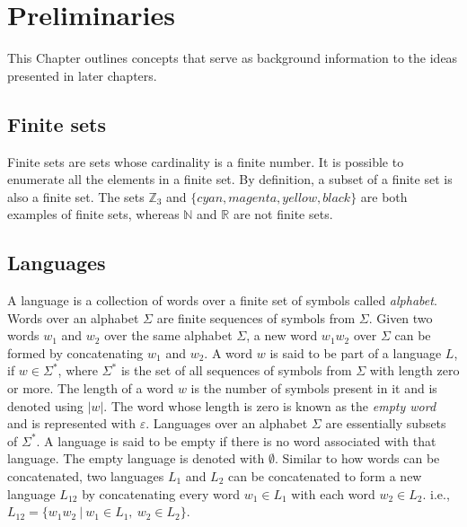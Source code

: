 \chapter{Preliminaries}\label{ch:prelims}
This Chapter outlines concepts that serve as background information to
the ideas presented in later chapters.

\section{Finite sets}
Finite sets are sets whose cardinality is a finite number.
It is possible to enumerate all the elements in a finite set.
By definition, a subset of a finite set is also a finite set.
The sets $\mathbb{Z}_3$ and $\{cyan, magenta, yellow, black\}$ are
both examples of finite sets, whereas $\mathbb{N}$ and $\mathbb{R}$
are not finite sets.            %

\section{Languages}
A language is a collection of words over a finite set of symbols
called \emph{alphabet}.
Words over an alphabet $\Sigma$ are finite sequences of symbols from
$\Sigma$.
Given two words $w_1$ and $w_2$ over the same alphabet $\Sigma$, a new
word $w_1 w_2$ over $\Sigma$ can be formed by concatenating $w_1$ and
$w_2$.
A word $w$ is said to be part of a language $L$, if $w \in \Sigma^*$,
where $\Sigma^*$ is the set of all sequences of symbols from $\Sigma$
with length zero or more.
The length of a word $w$ is the number of symbols present in it and is
denoted using $|w|$.
The word whose length is zero is known as the \emph{empty word} and is
represented with $\varepsilon$.
Languages over an alphabet $\Sigma$ are essentially subsets of
$\Sigma^*$.
A language is said to be empty if there is no word associated with
that language.
The empty language is denoted with $\emptyset$.
Similar to how words can be concatenated, two languages $L_1$ and
$L_2$ can be concatenated to form a new language $L_{12}$ by
concatenating every word $w_1 \in L_1$ with each word $w_2 \in L_2$.
i.e., $L_{12} = \{w_1w_2\ |\ w_1 \in L_1,\ w_2 \in L_2\}$.

